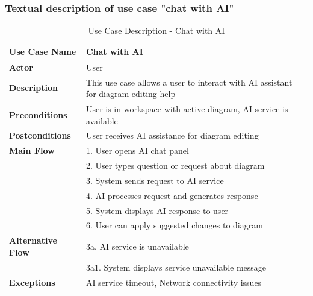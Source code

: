 \subsubsection{Textual description of use case "chat with AI"}
\begin{table}[H]
\centering
\caption{Use Case Description - Chat with AI}
\begin{tabular}{|l|p{10cm}|}
\hline
\textbf{Use Case Name} & Chat with AI \\
\hline
\textbf{Actor} & User \\
\hline
\textbf{Description} & This use case allows a user to interact with AI assistant for diagram editing help \\
\hline
\textbf{Preconditions} & User is in workspace with active diagram, AI service is available \\
\hline
\textbf{Postconditions} & User receives AI assistance for diagram editing \\
\hline
\textbf{Main Flow} & 1. User opens AI chat panel \\
& 2. User types question or request about diagram \\
& 3. System sends request to AI service \\
& 4. AI processes request and generates response \\
& 5. System displays AI response to user \\
& 6. User can apply suggested changes to diagram \\
\hline
\textbf{Alternative Flow} & 3a. AI service is unavailable \\
& 3a1. System displays service unavailable message \\
\hline
\textbf{Exceptions} & AI service timeout, Network connectivity issues \\
\hline
\end{tabular}
\end{table}


